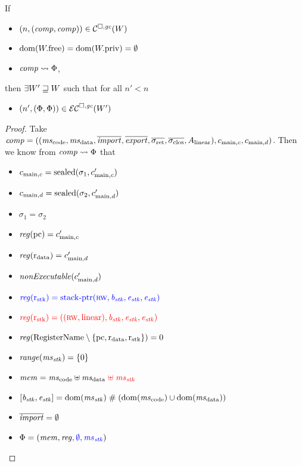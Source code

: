 \documentclass[a4paper]{article}
\begin{document}
\begin{lemma}
  \label{lem:compat-initial-ec}
  If
  \begin{itemize}
  \item $\npair{(\var{comp},\var{comp})} \in \lrcomp(W)$
  \item $\dom(\pwfree) = \dom(\pwpriv) = \emptyset$
  \item $\var{comp} \rightsquigarrow \Phi$,
  \end{itemize}
  then $\exists W' \future W$ such that for all $n' < n$
  \begin{itemize}
  \item $\npair[n']{(\Phi,\Phi)}\in\lrec(W')$
  \end{itemize}
\end{lemma}
\begin{proof}
  Take $\var{comp} = ((\mscode, \msdata, \overline{\var{import}}, \overline{\var{export}}, \sigrets, \sigcloss,A_\linear),  c_{\mathrm{main},c}, c_{\mathrm{main},d})$.
  Then we know from $\var{comp} \rightsquigarrow \Phi$ that
  \begin{itemize}
  \item $c_{\mathrm{main},c} = \sealed{\sigma_1, c_{\mathrm{main},c}'}$ 
  \item $c_{\mathrm{main},d} = \sealed{\sigma_2, c_{\mathrm{main},d}'}$
  \item $\sigma_1 = \sigma_2$
  \item $\reg(\pcreg) = c_{\mathrm{main},c}'$
  \item $\reg(\rdata) = c_{\mathrm{main},d}'$ 
  \item $\nonExec{c_{\mathrm{main},d}'}$
  \item $\src{\reg(\rstk) = \stkptr{\rw,\baddr_\stk,\eaddr_\stk,\eaddr_\stk}}$ 
  \item $\trg{\reg(\rstk) = ((\rw,\linear),\baddr_\stk,\eaddr_\stk,\eaddr_\stk)}$ 
  \item $\reg(\RegName \setminus \{\pcreg,\rdata,\rstk\}) = 0$
  \item $\range{\ms_\stk} = \{0\}$
  \item $\mem = \mscode \uplus \msdata \trg{\;\uplus\; \ms_\stk}$
  \item $[\baddr_\stk,\eaddr_\stk] = \dom(\ms_\stk ) \mathrel{\#} (\dom(\mscode) \cup \dom(\msdata))$
  \item $\overline{\var{import}} = \emptyset$
  \item $\Phi = (\mem, \reg\src{, \emptyset, \ms_\stk})$
  \end{itemize}


\end{proof}
\end{document}
